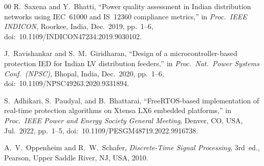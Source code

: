 \documentclass[conference]{IEEEtran}
\begin{document}
\begin{thebibliography}{00}
R.~Saxena and Y.~Bhatti,
``Power quality assessment in Indian distribution networks using
IEC~61000 and IS~12360 compliance metrics,''
in \textit{Proc.\ IEEE INDICON}, Roorkee, India, Dec.\ 2019, pp.~1--6,
doi:~10.1109/INDICON47234.2019.9030102.

J.~Ravishankar and S.~M.~Giridharan,
``Design of a microcontroller-based protection IED for Indian LV
distribution feeders,''
in \textit{Proc.\ Nat.\ Power Systems Conf.\ (NPSC)}, Bhopal, India,
Dec.\ 2020, pp.~1--6, doi:~10.1109/NPSC49263.2020.9331894.

S.~Adhikari, S.~Paudyal, and B.~Bhattarai,
``FreeRTOS-based implementation of real-time protection algorithms
on Xtensa LX6 embedded platforms,''
in \textit{Proc.\ IEEE Power and Energy Society General Meeting},
Denver, CO, USA, Jul.\ 2022, pp.~1--5,
doi:~10.1109/PESGM48719.2022.9916738.

A.~V.~Oppenheim and R.~W.~Schafer,
\textit{Discrete-Time Signal Processing}, 3rd~ed.,
Pearson, Upper Saddle River, NJ, USA, 2010.

\end{thebibliography}
\end{document}
